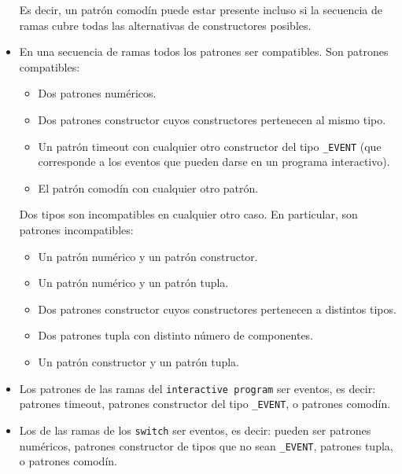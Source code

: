\documentclass{article}
\begin{document}
\begin{itemize}
      Es decir, un patr\'on comod\'in puede estar presente incluso si la secuencia de ramas
      cubre todas las alternativas de constructores posibles.
\item En una secuencia de ramas todos los patrones \DEBEN ser compatibles.
      Son patrones compatibles:
      \begin{itemize}
      \item Dos patrones num\'ericos.
      \item Dos patrones constructor cuyos constructores pertenecen al mismo tipo.
      \item Un patr\'on timeout con cualquier otro constructor del tipo \texttt{\_EVENT}
            (que corresponde a los eventos que pueden darse en un programa interactivo).
      \item El patr\'on comod\'in con cualquier otro patr\'on.
      \end{itemize}
      Dos tipos son incompatibles en cualquier otro caso. En particular, son patrones incompatibles:
      \begin{itemize}
      \item Un patr\'on num\'erico y un patr\'on constructor.
      \item Un patr\'on num\'erico y un patr\'on tupla.
      \item Dos patrones constructor cuyos constructores pertenecen a distintos tipos.
      \item Dos patrones tupla con distinto n\'umero de componentes.
      \item Un patr\'on constructor y un patr\'on tupla.
      \end{itemize}
\item Los patrones de las ramas del \texttt{interactive program}
      \DEBEN ser eventos, es decir:
      patrones timeout,
      patrones constructor del tipo \texttt{\_EVENT},
      o patrones comod\'in.
\item Los de las ramas de los \texttt{switch} \NOPUEDEN ser eventos, es decir:
      pueden ser
      patrones num\'ericos,
      patrones constructor de tipos que no sean \texttt{\_EVENT},
      patrones tupla,
      o patrones comod\'in.
\end{itemize}
\end{document}
